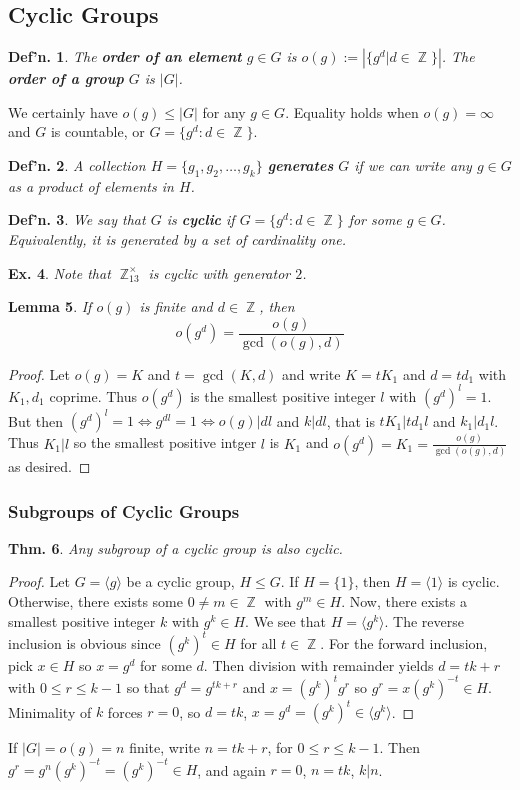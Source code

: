 \documentclass[12pt, a4paper]{book}
\DeclareMathOperator{\Z}{\mathbb{Z}}
\newtheorem{theorem}{Thm.}[section]
\newtheorem{lemma}[theorem]{Lemma}
\newtheorem{definition}[theorem]{Def'n.}
\newtheorem{example}[theorem]{Ex.}
\theoremstyle{nonumberplain}
\newtheorem{proof}{Proof}
\begin{document}
\subsection{Cyclic Groups}
\begin{definition}
    The \textbf{order of an element} $g\in G$ is $o(g):=\left\lvert\{g^d|d\in\Z\}\right\rvert$.
    The \textbf{order of a group} $G$ is $|G|$.
\end{definition}
We certainly have $o(g)\leq|G|$ for any $g\in G$.
Equality holds when $o(g)=\infty$ and $G$ is countable, or $G=\{g^d:d\in\Z\}$.
\begin{definition}
    A collection $H=\{g_1,g_2,\ldots,g_k\}$ \textbf{generates} $G$ if we can write any $g\in G$ as a product of elements in $H$.
\end{definition}
\begin{definition}
    We say that $G$ is \textbf{cyclic} if $G=\{g^d:d\in\Z\}$ for some $g\in G$.
    Equivalently, it is generated by a set of cardinality one.
\end{definition}
\begin{example}
    Note that $\Z_{13}^\times$ is cyclic with generator $2$.
\end{example}
\begin{lemma}
    If $o(g)$ is finite and $d\in\Z$, then
    \[o(g^d)=\frac{o(g)}{\gcd(o(g),d)}\]
\end{lemma}
\begin{proof}
    Let $o(g)=K$ and $t=\gcd(K,d)$ and write $K=tK_1$ and $d=td_1$ with $K_1,d_1$ coprime.
    Thus $o(g^d)$ is the smallest positive integer $l$ with $(g^d)^l=1$.
    But then $(g^d)^l=1\Leftrightarrow g^{dl}=1\Leftrightarrow o(g)|dl$ and $k|dl$, that is $tK_1|td_1l$ and $k_1|d_1l$.
    Thus $K_1|l$ so the smallest positive intger $l$ is $K_1$ and $o(g^d)=K_1=\frac{o(g)}{\gcd(o(g),d)}$ as desired.
\end{proof}
\subsubsection{Subgroups of Cyclic Groups}
\begin{theorem}
    Any subgroup of a cyclic group is also cyclic.
\end{theorem}
\begin{proof}
    Let $G=\langle g\rangle$ be a cyclic group, $H\leq G$.
    If $H=\{1\}$, then $H=\langle 1\rangle$ is cyclic.
    Otherwise, there exists some $0\neq m\in\Z$ with $g^m\in H$.
    Now, there exists a smallest positive integer $k$ with $g^k\in H$.
    We see that $H=\langle g^k\rangle$.
    The reverse inclusion is obvious since $(g^k)^t\in H$ for all $t\in\Z$.
    For the forward inclusion, pick $x\in H$ so $x=g^d$ for some $d$.
    Then division with remainder yields $d=tk+r$ with $0\leq r\leq k-1$ so that
    $g^d=g^{tk+r}$ and $x=(g^k)^tg^r$ so $g^r=x(g^k)^{-t}\in H$.
    Minimality of $k$ forces $r=0$, so $d=tk$, $x=g^d=(g^k)^t\in\langle g^k\rangle$.
\end{proof}
If $|G|=o(g)=n$ finite, write $n=tk+r$, for $0\leq r\leq k-1$.
Then $g^r=g^n(g^k)^{-t}=(g^k)^{-t}\in H$, and again $r=0$, $n=tk$, $k|n$.
\end{document}
